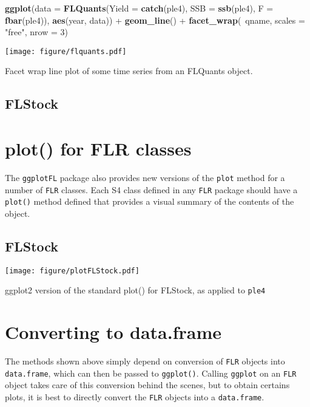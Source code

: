 \documentclass{tufte-handout}
\newenvironment{Shaded}{}{}
\newcommand{\KeywordTok}[1]{\textcolor[rgb]{0.00,0.44,0.13}{\textbf{{#1}}}}
\newcommand{\DataTypeTok}[1]{\textcolor[rgb]{0.56,0.13,0.00}{{#1}}}
\newcommand{\DecValTok}[1]{\textcolor[rgb]{0.25,0.63,0.44}{{#1}}}
\newcommand{\StringTok}[1]{\textcolor[rgb]{0.25,0.44,0.63}{{#1}}}
\newcommand{\NormalTok}[1]{{#1}}
\begin{document}
\begin{Shaded}
\begin{Highlighting}[]
\KeywordTok{ggplot}\NormalTok{(}\DataTypeTok{data =} \KeywordTok{FLQuants}\NormalTok{(}\DataTypeTok{Yield =} \KeywordTok{catch}\NormalTok{(ple4), }\DataTypeTok{SSB =} \KeywordTok{ssb}\NormalTok{(ple4), }
    \DataTypeTok{F =} \KeywordTok{fbar}\NormalTok{(ple4)), }\KeywordTok{aes}\NormalTok{(year, data)) + }\KeywordTok{geom_line}\NormalTok{() + }
    \KeywordTok{facet_wrap}\NormalTok{(~qname, }\DataTypeTok{scales =} \StringTok{"free"}\NormalTok{, }\DataTypeTok{nrow =} \DecValTok{3}\NormalTok{)}
\end{Highlighting}
\end{Shaded}
\begin{marginfigure}
\centering
\texttt{[image: figure/flquants.pdf]}
\caption{Facet wrap line plot of some time series from an FLQuants
object.}
\end{marginfigure}

\subsection{FLStock}

\section{plot() for FLR classes}

The \texttt{ggplotFL} package also provides new versions of the
\texttt{plot} method for a number of \texttt{FLR} classes. Each S4 class
defined in any \texttt{FLR} package should have a \texttt{plot()} method
defined that provides a visual summary of the contents of the object.

\subsection{FLStock}

\begin{marginfigure}
\centering
\texttt{[image: figure/plotFLStock.pdf]}
\caption{ggplot2 version of the standard plot() for FLStock, as applied
to \texttt{ple4}}
\end{marginfigure}

\section{Converting to data.frame}

The methods shown above simply depend on conversion of \texttt{FLR}
objects into \texttt{data.frame}, which can then be passed to
\texttt{ggplot()}. Calling \texttt{ggplot} on an \texttt{FLR} object
takes care of this conversion behind the scenes, but to obtain certains
plots, it is best to directly convert the \texttt{FLR} objects into a
\texttt{data.frame}.
\end{document}
